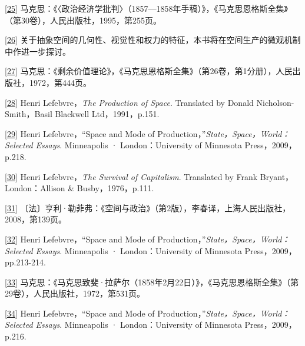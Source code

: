 \documentclass[UTF8, fontset = sourcesans, a4paper, oneside, zihao =
-4, scheme=chinese, no-math, space=true]{ctexbook}
\begin{document}
\protect\hypertarget{part0007_split_004.htmlux5cux23m25}{}{}\protect\hyperlink{part0007_split_001.htmlux5cux23w25}{{[}25{]}}
马克思：《〈政治经济学批判〉（1857---1858年手稿）》，《马克思恩格斯全集》（第30卷），人民出版社，1995，第255页。

\protect\hypertarget{part0007_split_004.htmlux5cux23m26}{}{}\protect\hyperlink{part0007_split_001.htmlux5cux23w26}{{[}26{]}}
关于抽象空间的几何性、视觉性和权力的特征，本书将在空间生产的微观机制中作进一步探讨。

\protect\hypertarget{part0007_split_004.htmlux5cux23m27}{}{}\protect\hyperlink{part0007_split_001.htmlux5cux23w27}{{[}27{]}}
马克思：《剩余价值理论》，《马克思恩格斯全集》（第26卷，第1分册），人民出版社，1972，第444页。

\protect\hypertarget{part0007_split_004.htmlux5cux23m28}{}{}\protect\hyperlink{part0007_split_001.htmlux5cux23w28}{{[}28{]}}
Henri Lefebvre，\emph{The Production of Space}. Translated by Donald
Nicholson-Smith，Basil Blackwell Ltd，1991，p.151.

\protect\hypertarget{part0007_split_004.htmlux5cux23m29}{}{}\protect\hyperlink{part0007_split_001.htmlux5cux23w29}{{[}29{]}}
Henri Lefebvre，``Space and Mode of
Production，''\emph{State，Space，World：Selected Essays}. Minneapolis ·
London：University of Minnesota Press，2009，p.218.

\protect\hypertarget{part0007_split_004.htmlux5cux23m30}{}{}\protect\hyperlink{part0007_split_001.htmlux5cux23w30}{{[}30{]}}
Henri Lefebvre，\emph{The Survival of Capitalism}. Translated by Frank
Bryant，London：Allison \& Busby，1976，p.111.

\protect\hypertarget{part0007_split_004.htmlux5cux23m31}{}{}\protect\hyperlink{part0007_split_001.htmlux5cux23w31}{{[}31{]}}
〔法〕亨利·勒菲弗：《空间与政治》（第2版），李春译，上海人民出版社，2008，第139页。

\protect\hypertarget{part0007_split_004.htmlux5cux23m32}{}{}\protect\hyperlink{part0007_split_002.htmlux5cux23w32}{{[}32{]}}
Henri Lefebvre，``Space and Mode of
Production，''\emph{State，Space，World：Selected Essays}. Minneapolis ·
London：University of Minnesota Press，2009，pp.213-214.

\protect\hypertarget{part0007_split_004.htmlux5cux23m33}{}{}\protect\hyperlink{part0007_split_002.htmlux5cux23w33}{{[}33{]}}
马克思：《马克思致斐·拉萨尔（1858年2月22日）》，《马克思恩格斯全集》（第29卷），人民出版社，1972，第531页。

\protect\hypertarget{part0007_split_004.htmlux5cux23m34}{}{}\protect\hyperlink{part0007_split_002.htmlux5cux23w34}{{[}34{]}}
Henri Lefebvre，``Space and Mode of
Production，''\emph{State，Space，World：Selected Essays}. Minneapolis ·
London：University of Minnesota Press，2009，p.216.
\end{document}
